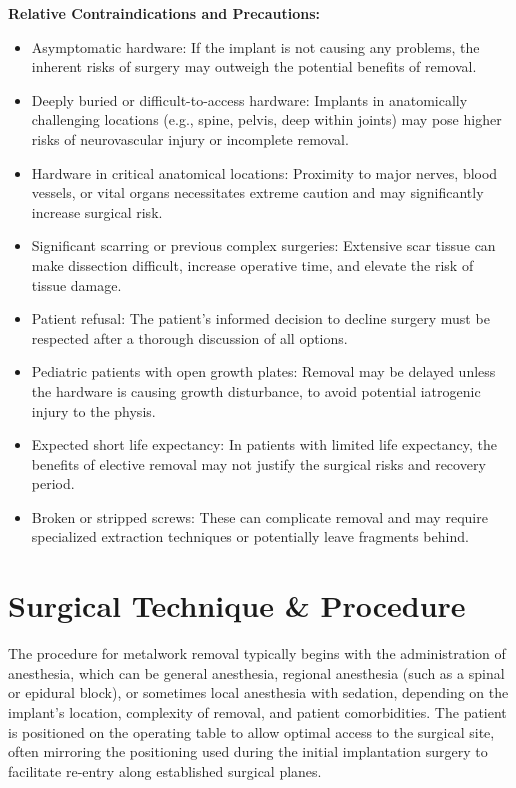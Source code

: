 \textbf{Relative Contraindications and Precautions:}
\begin{itemize}
  \item Asymptomatic hardware: If the implant is not causing any problems, the inherent risks of surgery may outweigh the potential benefits of removal.
  \item Deeply buried or difficult-to-access hardware: Implants in anatomically challenging locations (e.g., spine, pelvis, deep within joints) may pose higher risks of neurovascular injury or incomplete removal.
  \item Hardware in critical anatomical locations: Proximity to major nerves, blood vessels, or vital organs necessitates extreme caution and may significantly increase surgical risk.
  \item Significant scarring or previous complex surgeries: Extensive scar tissue can make dissection difficult, increase operative time, and elevate the risk of tissue damage.
  \item Patient refusal: The patient's informed decision to decline surgery must be respected after a thorough discussion of all options.
  \item Pediatric patients with open growth plates: Removal may be delayed unless the hardware is causing growth disturbance, to avoid potential iatrogenic injury to the physis.
  \item Expected short life expectancy: In patients with limited life expectancy, the benefits of elective removal may not justify the surgical risks and recovery period.
  \item Broken or stripped screws: These can complicate removal and may require specialized extraction techniques or potentially leave fragments behind.
\end{itemize}

\section*{Surgical Technique \& Procedure}
The procedure for metalwork removal typically begins with the administration of anesthesia, which can be general anesthesia, regional anesthesia (such as a spinal or epidural block), or sometimes local anesthesia with sedation, depending on the implant's location, complexity of removal, and patient comorbidities. The patient is positioned on the operating table to allow optimal access to the surgical site, often mirroring the positioning used during the initial implantation surgery to facilitate re-entry along established surgical planes.

